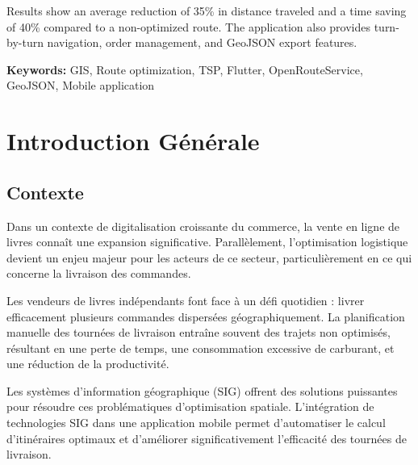 \documentclass[12pt,a4paper]{report}
\begin{document}
Results show an average reduction of 35\% in distance traveled and a time saving of 40\% compared to a non-optimized route. The application also provides turn-by-turn navigation, order management, and GeoJSON export features.

\textbf{Keywords:} GIS, Route optimization, TSP, Flutter, OpenRouteService, GeoJSON, Mobile application

\newpage


\tableofcontents
\newpage

\listoffigures
\newpage

\listoftables
\newpage


\chapter{Introduction Générale}

\section{Contexte}

Dans un contexte de digitalisation croissante du commerce, la vente en ligne de livres connaît une expansion significative. Parallèlement, l'optimisation logistique devient un enjeu majeur pour les acteurs de ce secteur, particulièrement en ce qui concerne la livraison des commandes.

Les vendeurs de livres indépendants font face à un défi quotidien : livrer efficacement plusieurs commandes dispersées géographiquement. La planification manuelle des tournées de livraison entraîne souvent des trajets non optimisés, résultant en une perte de temps, une consommation excessive de carburant, et une réduction de la productivité.

Les systèmes d'information géographique (SIG) offrent des solutions puissantes pour résoudre ces problématiques d'optimisation spatiale. L'intégration de technologies SIG dans une application mobile permet d'automatiser le calcul d'itinéraires optimaux et d'améliorer significativement l'efficacité des tournées de livraison.
\end{document}

